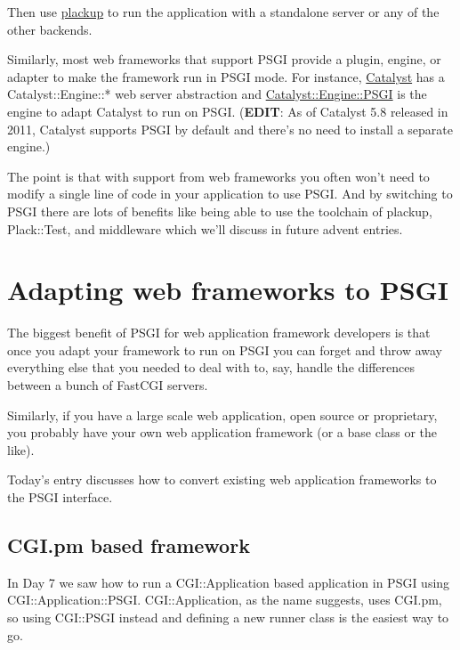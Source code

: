 Then use
\href{http://advent.plackperl.org/2009/12/day-3-using-plackup.html}{plackup}
to run the application with a standalone server or any of the other
backends.

Similarly, most web frameworks that support PSGI provide a plugin,
engine, or adapter to make the framework run in PSGI mode. For instance,
\href{http://www.catalystframework.org/}{Catalyst} has a
Catalyst::Engine::* web server abstraction and
\href{http://search.cpan.org/perldoc?Catalyst::Engine::PSGI}{Catalyst::Engine::PSGI}
is the engine to adapt Catalyst to run on PSGI. (\textbf{EDIT}: As of
Catalyst 5.8 released in 2011, Catalyst supports PSGI by default and
there's no need to install a separate engine.)

The point is that with support from web frameworks you often won't need
to modify a single line of code in your application to use PSGI. And by
switching to PSGI there are lots of benefits like being able to use the
toolchain of plackup, Plack::Test, and middleware which we'll discuss in
future advent entries.

\chapter{Adapting web frameworks to
PSGI}\label{day-8-adapting-web-frameworks-to-psgi}

The biggest benefit of PSGI for web application framework developers is
that once you adapt your framework to run on PSGI you can forget and
throw away everything else that you needed to deal with to, say, handle
the differences between a bunch of FastCGI servers.

Similarly, if you have a large scale web application, open source or
proprietary, you probably have your own web application framework (or a
base class or the like).

Today's entry discusses how to convert existing web application
frameworks to the PSGI interface.

\section{CGI.pm based framework}\label{cgi.pm-based-framework}

In Day 7 we saw how to run a CGI::Application based application in PSGI
using CGI::Application::PSGI. CGI::Application, as the name suggests,
uses CGI.pm, so using CGI::PSGI instead and defining a new runner class
is the easiest way to go.

